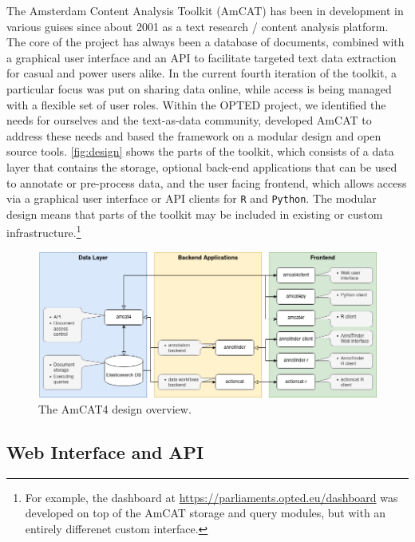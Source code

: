 \documentclass[
  a4paper,
  DIV=11,
  numbers=noendperiod]{scrartcl}
\begin{document}
The Amsterdam Content Analysis Toolkit (AmCAT) has been in development
in various guises since about 2001 as a text research / content analysis
platform. The core of the project has always been a database of
documents, combined with a graphical user interface and an API to
facilitate targeted text data extraction for casual and power users
alike. In the current fourth iteration of the toolkit, a particular
focus was put on sharing data online, while access is being managed with
a flexible set of user roles. Within the OPTED project, we identified
the needs for ourselves and the text-as-data community, developed AmCAT
to address these needs and based the framework on a modular design and
open source tools. \autoref{fig:design} shows the parts of the toolkit,
which consists of a data layer that contains the storage, optional
back-end applications that can be used to annotate or pre-process data,
and the user facing frontend, which allows access via a graphical user
interface or API clients for \texttt{R} and \texttt{Python}. The modular
design means that parts of the toolkit may be included in existing or
custom infrastructure.\footnote{ For example, the dashboard at
  \url{https://parliaments.opted.eu/dashboard} was developed on top of
  the AmCAT storage and query modules, but with an entirely differenet
  custom interface.}

\begin{figure}

{\centering \includegraphics{media/amcat-flow.drawio.png}

}

\caption{The AmCAT4 design overview.\label{fig:design}}

\end{figure}

\hypertarget{web-interface-and-api}{%
\subsection{Web Interface and API}\label{web-interface-and-api}}
\end{document}
